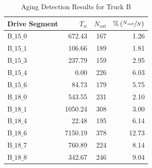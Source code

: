 \begin{table}[H]
        \centering
        \caption{Aging Detection Results for Truck B}
        \label{tab::mes_aging_res}
        \begin{tabular}{l r r r}
                \hline \hline
                Drive Segment & $T_w$   & $N_{sat}$ & $\% \left(  \sfrac{N_{sat}}{N}  \right)$ \\ \hline \hline
                B$\_15\_0$    & 672.43  & 167       & 1.26                           \\
                B$\_15\_1$    & 106.66  & 189       & 1.81                           \\
                B$\_15\_3$    & 237.79  & 159       & 2.95                           \\
                B$\_15\_4$    & 0.00    & 226       & 6.03                           \\
                B$\_15\_6$    & 84.73   & 179       & 5.75                           \\ \hline
                B$\_18\_0$    & 543.55  & 231       & 2.10                           \\
                B$\_18\_1$    & 1050.24 & 308       & 3.00                           \\
                B$\_18\_4$    & 22.48   & 195       & 6.14                           \\
                B$\_18\_6$    & 7150.19 & 378       & 12.73                          \\
                B$\_18\_7$    & 760.89  & 224       & 8.14                           \\
                B$\_18\_8$    & 342.67  & 246       & 9.04                           \\
                \hline \hline
        \end{tabular}
\end{table}
